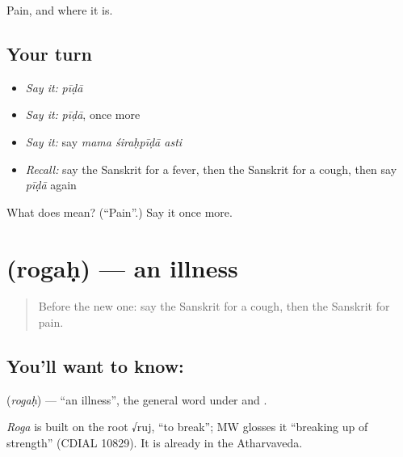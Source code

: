 \begin{grammarlens}[title={What you've built}]
Pain, and where it is.
\end{grammarlens}

\subsection*{Your turn}
\begin{itemize}
\raggedright
  \item \emph{Say it:} \emph{pīḍā}
  \item \emph{Say it:} \emph{pīḍā}, once more
  \item \emph{Say it:} say \emph{mama śiraḥpīḍā asti}
  \item \emph{Recall:} say the Sanskrit for a fever, then the Sanskrit for a cough, then say \emph{pīḍā} again
\end{itemize}

\begin{tcolorbox}[breakable,colback=teal!4,colframe=teal!35!black,title={Before you move on}]
What does  mean? (\textquotedblleft{}Pain\textquotedblright{}.) Say it once more.
\end{tcolorbox}
\section[\texorpdfstring{\sk{रोगः} (rogaḥ)}{रोगः (rogaḥ)}]{ (rogaḥ) — an illness}

\label{lesson:SA-C66-illness}



\begin{quote}
Before the new one: say the Sanskrit for a cough, then the Sanskrit for pain.
\end{quote}

\subsection*{You'll want to know: }
\textbf{} (\emph{rogaḥ}) — \textquotedblleft{}an illness\textquotedblright{}, the general word under \textbf{} and \textbf{}.

\begin{cousinweb}
\emph{Roga} is built on the root √ruj, \textquotedblleft{}to break\textquotedblright{}; MW glosses it \textquotedblleft{}breaking up of strength\textquotedblright{} (CDIAL 10829). It is already in the Atharvaveda.
\end{cousinweb}

